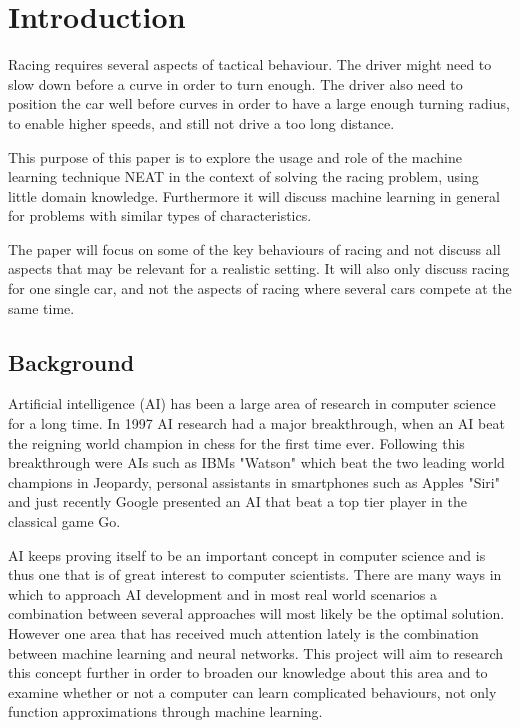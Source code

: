 \chapter{Introduction}

Racing requires several aspects of tactical behaviour. The driver might need to slow down before a curve in order to turn enough. The driver also need to position the car well before curves in order to have a large enough turning radius, to enable higher speeds, and still not drive a too long distance.

This purpose of this paper is to explore the usage and role of the machine learning technique NEAT in the context of solving the racing problem, using little domain knowledge. Furthermore it will discuss machine learning in general for problems with similar types of characteristics.

The paper will focus on some of the key behaviours of racing and not discuss all aspects that may be relevant for a realistic setting. It will also only discuss racing for one single car, and not the aspects of racing where several cars compete at the same time. 


\section{Background} %
Artificial intelligence (AI) has been a large area of research in computer science for a long time. In 1997 AI research had a major breakthrough, when an AI beat the reigning world champion in chess for the first time ever. Following this breakthrough were AIs such as IBMs "Watson" which beat the two leading world champions in Jeopardy, personal assistants in smartphones such as Apples "Siri" and just recently Google presented an AI that beat a top tier player in the classical game Go.


AI keeps proving itself to be an important concept in computer science and is thus one that is of great interest to computer scientists. There are many ways in which to approach AI development and in most real world scenarios a combination between several approaches will most likely be the optimal solution. However one area that has received much attention lately is the combination between machine learning and neural networks. This project will aim to research this concept further in order to broaden our knowledge about this area and to examine whether or not a computer can learn complicated behaviours, not only function approximations through machine learning. %

